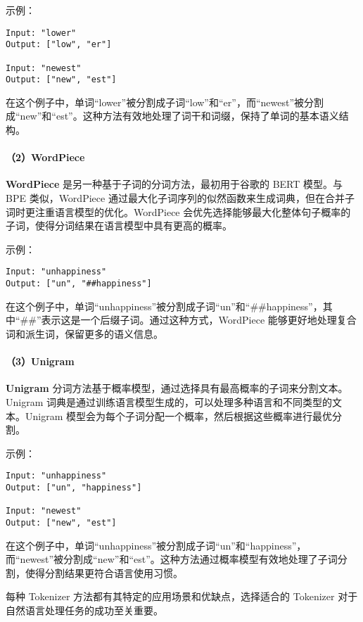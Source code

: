 \documentclass[
]{article}
\begin{document}
示例：

\begin{verbatim}
Input: "lower"
Output: ["low", "er"]

Input: "newest"
Output: ["new", "est"]
\end{verbatim}

在这个例子中，单词``lower''被分割成子词``low''和``er''，而``newest''被分割成``new''和``est''。这种方法有效地处理了词干和词缀，保持了单词的基本语义结构。

\paragraph{（2）WordPiece}\label{wordpiece}

\textbf{WordPiece} 是另一种基于子词的分词方法，最初用于谷歌的 BERT
模型。与 BPE 类似，WordPiece
通过最大化子词序列的似然函数来生成词典，但在合并子词时更注重语言模型的优化。WordPiece
会优先选择能够最大化整体句子概率的子词，使得分词结果在语言模型中具有更高的概率。

示例：

\begin{verbatim}
Input: "unhappiness"
Output: ["un", "##happiness"]
\end{verbatim}

在这个例子中，单词``unhappiness''被分割成子词``un''和``\#\#happiness''，其中``\#\#''表示这是一个后缀子词。通过这种方式，WordPiece
能够更好地处理复合词和派生词，保留更多的语义信息。

\paragraph{（3）Unigram}\label{unigram}

\textbf{Unigram}
分词方法基于概率模型，通过选择具有最高概率的子词来分割文本。Unigram
词典是通过训练语言模型生成的，可以处理多种语言和不同类型的文本。Unigram
模型会为每个子词分配一个概率，然后根据这些概率进行最优分割。

示例：

\begin{verbatim}
Input: "unhappiness"
Output: ["un", "happiness"]

Input: "newest"
Output: ["new", "est"]
\end{verbatim}

在这个例子中，单词``unhappiness''被分割成子词``un''和``happiness''，而``newest''被分割成``new''和``est''。这种方法通过概率模型有效地处理了子词分割，使得分割结果更符合语言使用习惯。

每种 Tokenizer 方法都有其特定的应用场景和优缺点，选择适合的 Tokenizer
对于自然语言处理任务的成功至关重要。
\end{document}
